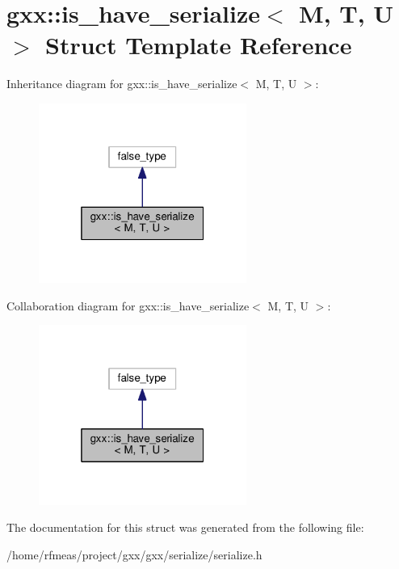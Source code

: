 \hypertarget{structgxx_1_1is__have__serialize}{}\section{gxx\+:\+:is\+\_\+have\+\_\+serialize$<$ M, T, U $>$ Struct Template Reference}
\label{structgxx_1_1is__have__serialize}


Inheritance diagram for gxx\+:\+:is\+\_\+have\+\_\+serialize$<$ M, T, U $>$\+:
\nopagebreak
\begin{figure}[H]
\begin{center}
\leavevmode
\includegraphics[width=193pt]{structgxx_1_1is__have__serialize__inherit__graph}
\end{center}
\end{figure}


Collaboration diagram for gxx\+:\+:is\+\_\+have\+\_\+serialize$<$ M, T, U $>$\+:
\nopagebreak
\begin{figure}[H]
\begin{center}
\leavevmode
\includegraphics[width=193pt]{structgxx_1_1is__have__serialize__coll__graph}
\end{center}
\end{figure}


The documentation for this struct was generated from the following file\+:\begin{DoxyCompactItemize}
\item 
/home/rfmeas/project/gxx/gxx/serialize/serialize.\+h\end{DoxyCompactItemize}
